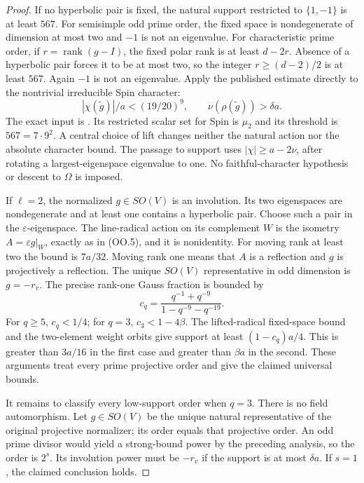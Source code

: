 \begin{proof}
If no hyperbolic pair is fixed, the natural support restricted
to $\{1,-1\}$ is at least $567$.  For semisimple odd prime
order, the fixed space is nondegenerate of dimension at most
two and $-1$ is not an eigenvalue.  For characteristic prime
order, if $r=\operatorname{rank}(g-I)$, the fixed polar rank
is at least $d-2r$.  Absence of a hyperbolic pair forces it
to be at most two, so the integer $r\ge(d-2)/2$ is at least
$567$.  Again $-1$ is not an eigenvalue.
Apply the published estimate directly to the nontrivial
irreducible Spin character:
\[
 |\chi(\widetilde g)|/a<(19/20)^9,\qquad
                     \nu(\rho(\widetilde g))>\delta a.      \tag{OSP.16}
\]
The exact input is
\cite[Theorem~4.3.6, (4.3.2), pp.~1917--1918;
complete proof pp.~1918--1923; Remark~4.3.7, p.~1923]{HOS:LST2011}.
Its restricted scalar set for Spin is $\mu_2$ and its
threshold is $567=7\cdot9^2$.  A central choice of lift changes
neither the natural action nor the absolute character bound.
The passage to support uses
$|\chi|\ge a-2\nu$, after rotating a largest-eigenspace
eigenvalue to one.  No faithful-character hypothesis or
descent to $\Omega$ is imposed.

If $\ell=2$, the normalized $g\in SO(V)$ is an involution.
Its two eigenspaces are nondegenerate and at least one
contains a hyperbolic pair.  Choose such a pair in the
$\varepsilon$-eigenspace.  The line-radical action on its
complement $W$ is the isometry $A=\varepsilon g|_W$,
exactly as in (OO.5), and it is nonidentity.
For moving rank at least two the bound is $7a/32$.
Moving rank one means that $A$ is a reflection and
$g$ is projectively a reflection.  The unique $SO(V)$
representative in odd dimension is $g=-r_v$.
The precise rank-one Gauss fraction is bounded by
\[
 c_q=\frac{q^{-1}+q^{-9}}{1-q^{-9}-q^{-19}}.
 \tag{OSP.17}
\]
For $q\ge5$, $c_q<1/4$; for $q=3$, $c_3<1-4\beta$.
The lifted-radical fixed-space bound and the two-element
weight orbits give support at least $(1-c_q)a/4$.
This is greater than $3a/16$ in the first case and
greater than $\beta a$ in the second.
These arguments treat every prime projective order and
give the claimed universal bounds.

It remains to classify every low-support order when $q=3$.
There is no field automorphism.  Let $g\in SO(V)$ be the
unique natural representative of the original projective
normalizer; its order equals that projective order.
An odd prime divisor would yield a strong-bound power by
the preceding analysis, so the order is $2^s$.
Its involution power must be $-r_v$ if the support is at
most $\delta a$.  If $s=1$, the claimed conclusion holds.


\end{proof}
